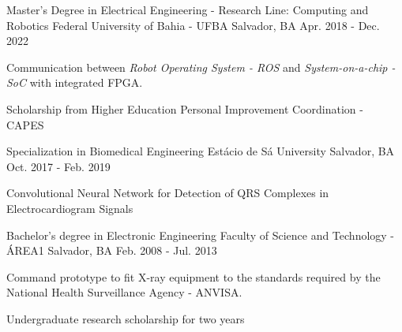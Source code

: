 

\begin{cventries}
  

  \cventry
    {Master's Degree in Electrical Engineering - Research Line: Computing and Robotics} %
    {Federal University of Bahia - UFBA} %
    {Salvador, BA} %
    {Apr. 2018 - Dec. 2022} %
    {
      \begin{cvitems} %
        \item {Communication between \textit{Robot Operating System - ROS} and \textit{System-on-a-chip - SoC} with integrated FPGA.}
        \item {Scholarship from Higher Education Personal Improvement Coordination - CAPES }
      \end{cvitems}
    }


  \cventry
    {Specialization in Biomedical Engineering} %
    {Estácio de Sá University} %
    {Salvador, BA} %
    {Oct. 2017 - Feb. 2019} %
    {
      \begin{cvitems} %
        \item {Convolutional Neural Network for Detection of QRS Complexes in Electrocardiogram Signals}
      \end{cvitems}
    }


  \cventry
    {Bachelor's degree in Electronic Engineering} %
    {Faculty of Science and Technology - ÁREA1} %
    {Salvador, BA} %
    {Feb. 2008 - Jul. 2013} %
    {
      \begin{cvitems} %
        \item {Command prototype to fit X-ray equipment to the standards required by the National Health Surveillance Agency - ANVISA.}
        \item {Undergraduate research scholarship for two years}
      \end{cvitems}
    }


\end{cventries}
